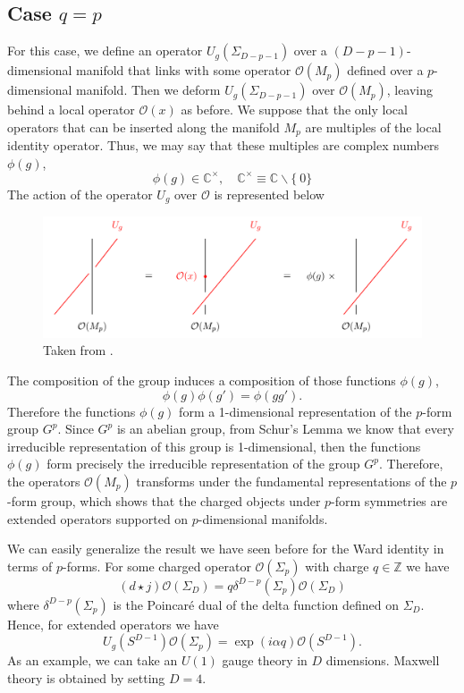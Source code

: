\documentclass{article}
\begin{document}
\subsection*{Case $q=p$}
For this case, we define an operator $U_g(\Sigma_{D-p-1})$ over a $(D-p-1)$-dimensional manifold that links with some operator  $\mathcal{O}(M_p)$ defined over a $p$-dimensional manifold. Then we deform $U_g(\Sigma_{D-p-1})$  over $\mathcal{O}(M_p)$, leaving behind a local operator $\mathcal{O}(x)$ as before. We suppose that the only local operators that can be inserted along the manifold $M_p$ are multiples of the local identity operator. Thus, we may say that these multiples are complex numbers $\phi(g)$,  
$$
\phi(g)\in \mathbb{C}^{\times},\quad \mathbb{C}^{\times}\equiv \mathbb{C}\backslash\{\ 0 \}
$$
The action of the operator $U_g$ over $\mathcal{O}$ is represented below 
\begin{figure}[h]
	\centering
	\includegraphics[scale=0.4]{figures/linking2.png}
	\caption{Taken from \cite{Bhardwaj}.} 
\end{figure}
The composition of the group induces a composition of those functions $\phi(g)$, 
$$
\phi(g)\phi(g')=\phi(gg').
$$
Therefore the functions $\phi(g)$ form a 1-dimensional representation of the $p$-form group $G^p$.  Since $G^p$ is an abelian group, from Schur’s Lemma we know that every irreducible representation of this group is 1-dimensional, then the functions $\phi(g)$ form precisely the irreducible representation of the group $G^p$. Therefore, the operators $\mathcal{O}(M_p)$ transforms under the fundamental representations of the $p$-form group, which shows that the charged objects under $p$-form symmetries are extended operators supported on $p$-dimensional manifolds. 

We can easily generalize the result we have seen before for the Ward identity in terms of $p$-forms. For some  charged operator $\mathcal{O}(\Sigma_p)$ with charge $q\in\mathbb{Z}$ we have
$$
(d\star j)\mathcal{O}(\Sigma_D)=q\delta^{D-p}(\Sigma_p)\mathcal{O}(\Sigma_D)
$$
where $\delta^{D-p}(\Sigma_p)$  is the Poincaré dual of the delta function defined on $\Sigma_D$. Hence, for extended operators we have 
$$
U_g(S^{D-1})\mathcal{O}(\Sigma_p)=\exp(i\alpha q)\mathcal{O}(S^{D-1}).
$$
As an example, we can take an $U(1)$ gauge theory in $D$ dimensions. Maxwell theory is obtained by setting $D=4$. 
\end{document}
